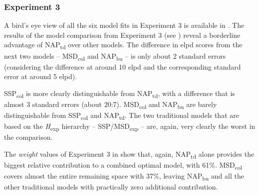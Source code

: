 \subsubsection{Experiment 3}\label{experiment-3}

A bird's eye view of all the six model fits in Experiment 3 is available in .
The results of the model comparison from Experiment 3 (see ) reveal a borderline advantage of NAP\textsubscript{td} over other models.
The difference in elpd scores from the next two models -- MSD\textsubscript{col} and NAP\textsubscript{bu} -- is only about 2 standard errors (considering the difference at around 10 elpd and the corresponding standard error at around 5 elpd). %

SSP\textsubscript{col} is more clearly distinguishable from NAP\textsubscript{td}, with a difference that is almost 3 standard errors (about 20:7). MSD\textsubscript{col} and NAP\textsubscript{bu} are barely distinguishable from SSP\textsubscript{col} and NAP\textsubscript{td}. The two traditional models that are based on the \emph{H}\textsubscript{exp} hierarchy -- SSP/MSD\textsubscript{exp} -- are, again, very clearly the worst in the comparison.

The \emph{weight} values of Experiment 3 in  show that, again, NAP\textsubscript{td} alone provides the biggest relative contribution to a combined optimal model, with 61\%. MSD\textsubscript{col} covers almost the entire remaining space with 37\%, leaving NAP\textsubscript{bu} and all the other traditional models with practically zero additional contribution.

